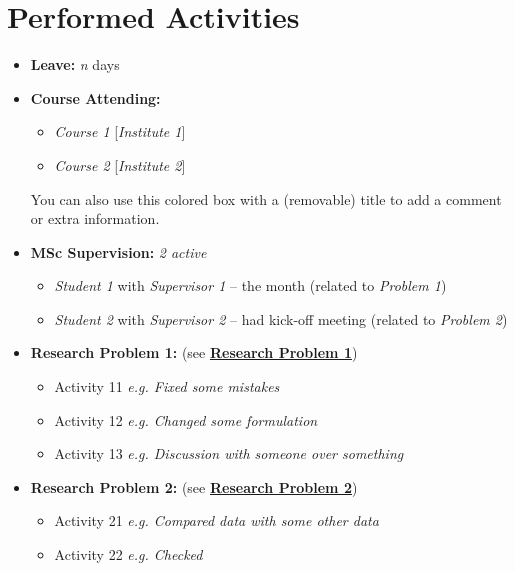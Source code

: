\documentclass[12pt]{article}
\theoremstyle{definition}
\begin{document}
\section*{Performed Activities}
\begin{itemize}
	
	\item \textbf{Leave:} \emph{n} days
	
	\item \textbf{Course Attending:} 
	\begin{itemize}
		\item \emph{Course 1} [\emph{Institute 1}]
		\item \emph{Course 2} [\emph{Institute 2}]
	\end{itemize}

	\smallskip
	\begin{tcolorbox}[fonttitle=\sffamily\large,colback=ColorDef!10,colframe=ColorDef,title=Title of the box,fontupper=\sffamily,breakable]	
		You can also use this colored box with a (removable) title to add a comment or extra information.
	\end{tcolorbox} 
	
	\item \textbf{MSc Supervision:} \emph{2 active} 
	\begin{itemize}
		\item \emph{Student 1} with \emph{Supervisor 1} -- the  month (related to \emph{Problem 1})
		\item \emph{Student 2} with \emph{Supervisor 2} -- had kick-off meeting (related to \emph{Problem 2})
	\end{itemize}
	
	\item \textbf{Research Problem 1:} (see \hyperref[tech1]{\textbf{Research Problem 1}})
	\begin{itemize}
		\item Activity 11 \emph{e.g. Fixed some mistakes} 
		\item Activity 12 \emph{e.g. Changed some formulation}
		\item Activity 13 \emph{e.g. Discussion with someone over something}
	\end{itemize}

	\item \textbf{Research Problem 2:} (see \hyperref[tech2]{\textbf{Research Problem 2}})
	\begin{itemize} 
		\item Activity 21 \emph{e.g. Compared data with some other data} 
		\item Activity 22 \emph{e.g. Checked \cite{CitationKey}}
	\end{itemize}

\end{itemize}
\end{document}

